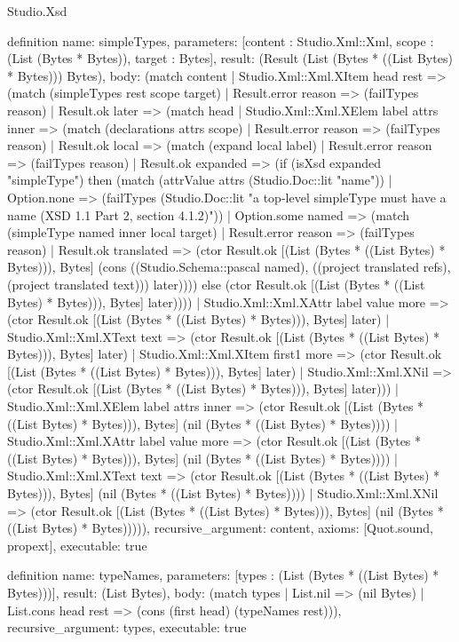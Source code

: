 \begin{lexlean}{Studio.Xsd}
\begin{semanticmodule}
definition{
  name: simpleTypes,
  parameters: [content : Studio.Xml::Xml, scope : (List (Bytes * Bytes)), target : Bytes],
  result: (Result (List (Bytes * ((List Bytes) * Bytes))) Bytes),
  body: (match content
    | Studio.Xml::Xml.XItem head rest => (match (simpleTypes rest scope target)
      | Result.error reason => (failTypes reason)
      | Result.ok later => (match head
        | Studio.Xml::Xml.XElem label attrs inner => (match (declarations attrs scope)
          | Result.error reason => (failTypes reason)
          | Result.ok local => (match (expand local label)
            | Result.error reason => (failTypes reason)
            | Result.ok expanded => (if (isXsd expanded "simpleType") then (match (attrValue attrs (Studio.Doc::lit "name"))
              | Option.none => (failTypes (Studio.Doc::lit "a top-level simpleType must have a name (XSD 1.1 Part 2, section 4.1.2)"))
              | Option.some named => (match (simpleType named inner local target)
                | Result.error reason => (failTypes reason)
                | Result.ok translated => (ctor Result.ok [(List (Bytes * ((List Bytes) * Bytes))), Bytes] (cons ((Studio.Schema::pascal named), ((project translated refs), (project translated text))) later)))) else (ctor Result.ok [(List (Bytes * ((List Bytes) * Bytes))), Bytes] later))))
        | Studio.Xml::Xml.XAttr label value more => (ctor Result.ok [(List (Bytes * ((List Bytes) * Bytes))), Bytes] later)
        | Studio.Xml::Xml.XText text => (ctor Result.ok [(List (Bytes * ((List Bytes) * Bytes))), Bytes] later)
        | Studio.Xml::Xml.XItem first1 more => (ctor Result.ok [(List (Bytes * ((List Bytes) * Bytes))), Bytes] later)
        | Studio.Xml::Xml.XNil => (ctor Result.ok [(List (Bytes * ((List Bytes) * Bytes))), Bytes] later)))
    | Studio.Xml::Xml.XElem label attrs inner => (ctor Result.ok [(List (Bytes * ((List Bytes) * Bytes))), Bytes] (nil (Bytes * ((List Bytes) * Bytes))))
    | Studio.Xml::Xml.XAttr label value more => (ctor Result.ok [(List (Bytes * ((List Bytes) * Bytes))), Bytes] (nil (Bytes * ((List Bytes) * Bytes))))
    | Studio.Xml::Xml.XText text => (ctor Result.ok [(List (Bytes * ((List Bytes) * Bytes))), Bytes] (nil (Bytes * ((List Bytes) * Bytes))))
    | Studio.Xml::Xml.XNil => (ctor Result.ok [(List (Bytes * ((List Bytes) * Bytes))), Bytes] (nil (Bytes * ((List Bytes) * Bytes))))),
  recursive_argument: content,
  axioms: [Quot.sound, propext],
  executable: true
}

definition{
  name: typeNames,
  parameters: [types : (List (Bytes * ((List Bytes) * Bytes)))],
  result: (List Bytes),
  body: (match types
    | List.nil => (nil Bytes)
    | List.cons head rest => (cons (first head) (typeNames rest))),
  recursive_argument: types,
  executable: true
}


\end{semanticmodule}
\end{lexlean}
